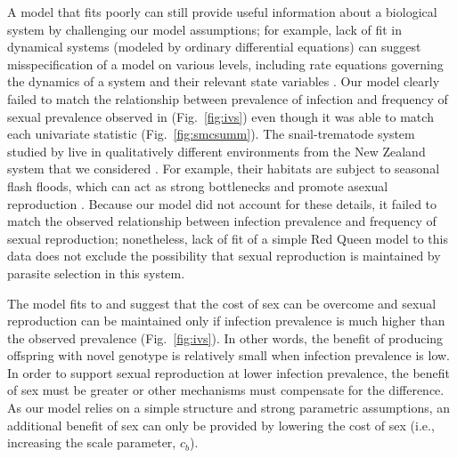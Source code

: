\documentclass{article}\usepackage[]{graphicx}\usepackage[]{color}
\newcommand{\fref}[1]{Fig.~\ref{fig:#1}}
\begin{document}
A model that fits poorly can still provide useful information about a biological
system by challenging our model assumptions;
for example, lack of fit in dynamical systems (modeled by ordinary differential 
equations) can suggest misspecification of a model on various levels, including
rate equations governing the dynamics of a system and their relevant state variables
\citep{hooker2015goodness}.
Our model clearly failed to match the relationship between prevalence of infection and frequency of sexual prevalence observed in \cite{dagan2013clonal} (\fref{ivs}) even though it was able to match each univariate statistic (\fref{smcsumm}).
The snail-trematode system studied by \cite{dagan2013clonal} live in qualitatively different environments from the New Zealand system that we considered \citep{vergara2014infection, mckone2016fine}.
For example, their habitats are subject to seasonal flash floods, which can act as 
strong bottlenecks and promote asexual reproduction \citep{ben2007temporal}.
Because our model did not account for these details, it failed to match the observed 
relationship between infection prevalence and frequency of sexual reproduction;
nonetheless, lack of fit of a simple Red Queen model to this data does not exclude the 
possibility that sexual reproduction is maintained by parasite selection in this 
system.

The model fits to \cite{dagan2013clonal} and \cite{mckone2016fine} suggest that the cost of sex can be overcome and sexual reproduction can be maintained only if infection prevalence is much higher than the observed prevalence (\fref{ivs}).
In other words, the benefit of producing offspring with novel genotype is relatively small when infection prevalence is low.
In order to support sexual reproduction at lower infection prevalence, the benefit of sex must be greater or other mechanisms must compensate for the difference.
As our model relies on a simple structure and strong parametric assumptions, an additional benefit of sex can only be provided by lowering the cost of sex (i.e., increasing the scale parameter, $c_b$).
\end{document}
